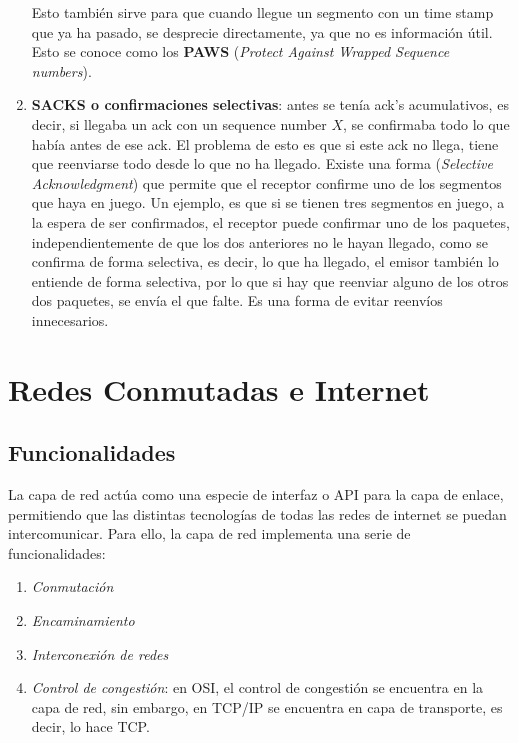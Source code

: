 \documentclass[10pt,a4paper,spanish]{report}
\begin{document}
\begin{enumerate}[\textcolor{tema3}{$\bullet$}]
  Esto también sirve para que cuando llegue un segmento con un time stamp que ya ha pasado, se desprecie directamente, ya que no es información útil. Esto se conoce como los \textbf{\textcolor{tema3}{PAWS}} (\textit{\textcolor{tema3}{Protect Against Wrapped Sequence numbers}}).

  \item \textbf{\textcolor{tema3}{SACKS o confirmaciones selectivas}}: antes se tenía ack's acumulativos, es decir, si llegaba un ack con un sequence number $X$, se confirmaba todo lo que había antes de ese ack. El problema de esto es que si este ack no llega, tiene que reenviarse todo desde lo que no ha llegado. Existe una forma (\textit{\textcolor{tema3}{Selective Acknowledgment}}) que permite que el receptor confirme uno de los segmentos que haya en juego. Un ejemplo, es que si se tienen tres segmentos en juego, a la espera de ser confirmados, el receptor puede confirmar uno de los paquetes, independientemente de que los dos anteriores no le hayan llegado, como se confirma de forma selectiva, es decir, lo que ha llegado, el emisor también lo entiende de forma selectiva, por lo que si hay que reenviar alguno de los otros dos paquetes, se envía el que falte. Es una forma de evitar reenvíos innecesarios.
\end{enumerate}

\chapter{\textcolor{tema4}{Redes Conmutadas e Internet}}
\section{\textcolor{tema4}Funcionalidades}
La capa de red actúa como una especie de interfaz o API para la capa de enlace, permitiendo que las distintas tecnologías de todas las redes de internet se puedan intercomunicar. Para ello, la capa de red implementa una serie de funcionalidades:
\begin{enumerate}[\color{tema4}{$\spadesuit$}]
  \item \textit{\textcolor{tema4}{Conmutación}}
  \item \textit{\textcolor{tema4}{Encaminamiento}}
  \item \textit{\textcolor{tema4}{Interconexión de redes}}
  \item \textit{\textcolor{tema4}{Control de congestión}}: en OSI, el control de congestión se encuentra en la capa de red, sin embargo, en TCP/IP se encuentra en capa de transporte, es decir, lo hace TCP.
\end{enumerate}
\end{document}
